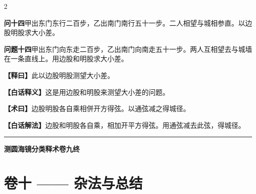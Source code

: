 \documentclass[11pt,a4paper]{article}
\newcommand{\WenQuestion}[1]{\textbf{\textcolor{classicalcolor}{#1}}}
\newcommand{\BaiQuestion}[1]{\textbf{\textcolor{moderncolor}{#1}}}
\newcommand{\WenExplain}{\textcolor{classicalcolor}{\textbf{【释曰】}}}
\newcommand{\BaiExplain}{\textcolor{moderncolor}{\textbf{【白话释义】}}}
\newcommand{\WenMethod}{\textcolor{classicalcolor}{\textbf{【术曰】}}}
\newcommand{\BaiMethod}{\textcolor{moderncolor}{\textbf{【白话解法】}}}
\begin{document}
\begin{paracol}{2}
\vspace{0.8em}

\switchcolumn*
\begin{tcolorbox}[colback=red!3,colframe=red!30!black,boxrule=0.3pt]
\WenQuestion{问十四}\quad 甲出东门东行二百步，乙出南门南行五十一步。二人相望与城相参直。以边股明股求大小差。
\end{tcolorbox}
\switchcolumn
\begin{tcolorbox}[colback=blue!3,colframe=blue!30!black,boxrule=0.3pt]
\BaiQuestion{问题十四}\quad 甲出东门向东走二百步，乙出南门向南走五十一步。两人互相望去与城墙在一条直线上。用边股和明股求大小差。
\end{tcolorbox}

\switchcolumn*
\begin{tcolorbox}[colback=red!5,colframe=red!30!black,boxrule=0.3pt]
\WenExplain\quad 此以边股明股测望大小差。
\end{tcolorbox}
\switchcolumn
\begin{tcolorbox}[colback=blue!5,colframe=blue!30!black,boxrule=0.3pt]
\BaiExplain\quad 这是用边股和明股来测望大小差的问题。
\end{tcolorbox}

\switchcolumn*
\begin{tcolorbox}[colback=red!5,colframe=red!40!black,boxrule=0.3pt]
\WenMethod\quad 边股明股各自乘相併开方得弦。以通弦减之得城径。
\end{tcolorbox}
\switchcolumn
\begin{tcolorbox}[colback=blue!5,colframe=blue!40!black,boxrule=0.3pt]
\BaiMethod\quad 边股和明股各自乘，相加开平方得弦。用通弦减去此弦，得城径。
\end{tcolorbox}

\end{paracol}

\vspace{1em}
\begin{center}
\rule{0.5\textwidth}{0.4pt}

\textbf{\textcolor{volumecolor}{测圆海镜分类释术卷九终}}
\end{center}



\newpage
\section*{\textcolor{volumecolor}{卷十} —— 杂法与总结}
\end{document}
